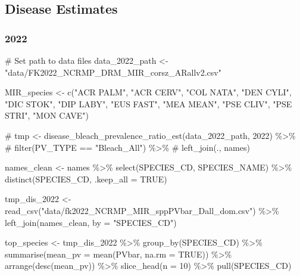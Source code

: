 \documentclass[
]{article}
\newenvironment{Shaded}{\begin{snugshade}}{\end{snugshade}}
\newcommand{\AttributeTok}[1]{\textcolor[rgb]{0.40,0.45,0.13}{#1}}
\newcommand{\CommentTok}[1]{\textcolor[rgb]{0.37,0.37,0.37}{#1}}
\newcommand{\ConstantTok}[1]{\textcolor[rgb]{0.56,0.35,0.01}{#1}}
\newcommand{\DecValTok}[1]{\textcolor[rgb]{0.68,0.00,0.00}{#1}}
\newcommand{\FunctionTok}[1]{\textcolor[rgb]{0.28,0.35,0.67}{#1}}
\newcommand{\NormalTok}[1]{\textcolor[rgb]{0.00,0.23,0.31}{#1}}
\newcommand{\OtherTok}[1]{\textcolor[rgb]{0.00,0.23,0.31}{#1}}
\newcommand{\SpecialCharTok}[1]{\textcolor[rgb]{0.37,0.37,0.37}{#1}}
\newcommand{\StringTok}[1]{\textcolor[rgb]{0.13,0.47,0.30}{#1}}
\begin{document}
\hypertarget{disease-estimates}{%
\subsection{Disease Estimates}\label{disease-estimates}}

\hypertarget{section-2}{%
\subsubsection{2022}\label{section-2}}

\begin{Shaded}
\begin{Highlighting}[]
\CommentTok{\# Set path to data files}
\NormalTok{data\_2022\_path }\OtherTok{\textless{}{-}} \StringTok{"data/FK2022\_NCRMP\_DRM\_MIR\_corsz\_ARallv2.csv"}


\NormalTok{MIR\_species }\OtherTok{\textless{}{-}} \FunctionTok{c}\NormalTok{(}\StringTok{"ACR PALM"}\NormalTok{, }\StringTok{"ACR CERV"}\NormalTok{, }\StringTok{"COL NATA"}\NormalTok{, }\StringTok{"DEN CYLI"}\NormalTok{, }\StringTok{"DIC STOK"}\NormalTok{, }\StringTok{"DIP LABY"}\NormalTok{, }\StringTok{"EUS FAST"}\NormalTok{, }\StringTok{"MEA MEAN"}\NormalTok{, }\StringTok{"PSE CLIV"}\NormalTok{, }\StringTok{"PSE STRI"}\NormalTok{, }\StringTok{"MON CAVE"}\NormalTok{)}

\CommentTok{\# tmp \textless{}{-} disease\_bleach\_prevalence\_ratio\_est(data\_2022\_path, 2022) \%\textgreater{}\%}
\CommentTok{\#   filter(PV\_TYPE == "Bleach\_All") \%\textgreater{}\%}
\CommentTok{\#   left\_join(., names)}

\NormalTok{names\_clean }\OtherTok{\textless{}{-}}\NormalTok{ names }\SpecialCharTok{\%\textgreater{}\%}
  \FunctionTok{select}\NormalTok{(SPECIES\_CD, SPECIES\_NAME) }\SpecialCharTok{\%\textgreater{}\%}
  \FunctionTok{distinct}\NormalTok{(SPECIES\_CD, }\AttributeTok{.keep\_all =} \ConstantTok{TRUE}\NormalTok{)}

\NormalTok{tmp\_dis\_2022 }\OtherTok{\textless{}{-}} \FunctionTok{read\_csv}\NormalTok{(}\StringTok{"data/fk2022\_NCRMP\_MIR\_sppPVbar\_Dall\_dom.csv"}\NormalTok{) }\SpecialCharTok{\%\textgreater{}\%}
    \FunctionTok{left\_join}\NormalTok{(names\_clean, }\AttributeTok{by =} \StringTok{"SPECIES\_CD"}\NormalTok{)}

\NormalTok{top\_species }\OtherTok{\textless{}{-}}\NormalTok{ tmp\_dis\_2022 }\SpecialCharTok{\%\textgreater{}\%}
  \FunctionTok{group\_by}\NormalTok{(SPECIES\_CD) }\SpecialCharTok{\%\textgreater{}\%}
  \FunctionTok{summarise}\NormalTok{(}\AttributeTok{mean\_pv =} \FunctionTok{mean}\NormalTok{(PVbar, }\AttributeTok{na.rm =} \ConstantTok{TRUE}\NormalTok{)) }\SpecialCharTok{\%\textgreater{}\%}
  \FunctionTok{arrange}\NormalTok{(}\FunctionTok{desc}\NormalTok{(mean\_pv)) }\SpecialCharTok{\%\textgreater{}\%}
  \FunctionTok{slice\_head}\NormalTok{(}\AttributeTok{n =} \DecValTok{10}\NormalTok{) }\SpecialCharTok{\%\textgreater{}\%}  
  \FunctionTok{pull}\NormalTok{(SPECIES\_CD)}


\end{Highlighting}
\end{Shaded}
\end{document}
